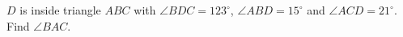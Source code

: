 $D$ is inside triangle $ABC$ with $\angle BDC=123^\circ$, $\angle ABD=15^\circ$ and $\angle ACD=21^\circ$. Find $\angle BAC$.

